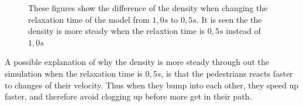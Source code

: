 \begin{figure}[h]
\centering
{}
\caption{These figures show the difference of the density when changing the relaxation time of the model from $1,0 s$ to $0,5 s$.
It is seen the the density is more steady when the relaxtion time is $0,5 s$ instead of $1,0 s$}
\label{fig:comparison_of_timestep}
\end{figure}

A possible explanation of why the density is more steady through out the simulation when the relaxation time is $0,5 s$,
is that the pedestrians reacts faster to changes of their velocity. Thus when they bump into each other, they speed up
faster, and therefore avoid clogging up before more get in their path.

